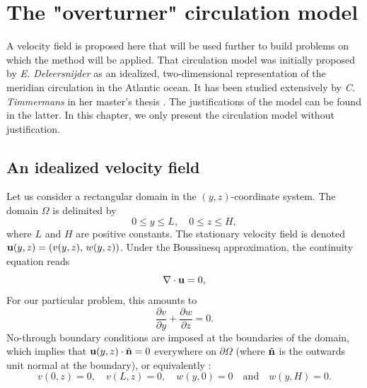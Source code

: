 \chapter{The "overturner" circulation model} \label{chap:overturnercirculation}
A velocity field is proposed here that will be used further to build problems on which the method will be applied. That circulation model was initially proposed by \textit{E. Deleersnijder} \cite{deleersnijder2006overturner} as an idealized, two-dimensional representation of the meridian circulation in the Atlantic ocean. It has been studied extensively by \textit{C. Timmermans} in her master's thesis \cite{timmermans2006masterthesis}. The justifications of the model can be found in the latter. In this chapter, we only present the circulation model without justification. 

\section{An idealized velocity field}
Let us consider a rectangular domain in the $(y,z)$-coordinate system. 
The domain $\Omega$ is delimited by
\begin{equation} 
	0 \le y \le L,\quad 0 \le z \le H,
\end{equation}
where $L$ and $H$ are positive constants. 
The stationary velocity field is denoted $\mathbf u(y,z) = (v(y,z),\, w(y,z))$. Under the Boussinesq approximation, the continuity equation reads
\begin{equation} \label{eq:continuity_boussinesq}
	\nabla \cdot \mathbf u = 0,
\end{equation}
For our particular problem, this amounts to
\begin{equation}
	\frac{\partial v}{\partial y} + \frac{\partial w}{\partial z} = 0.
\end{equation}
No-through boundary conditions are imposed at the boundaries of the domain, which implies that $\mathbf u(y,z) \cdot \hat{\mathbf{n}} = 0$ everywhere on $\partial \Omega$ (where $\hat{\mathbf{n}}$ is the outwards unit normal at the boundary), or equivalently :
\begin{equation} \label{eq:overturnerBC}
	v(0,z) = 0, \quad v(L,z) = 0, \quad w(y,0) = 0 \quad \mbox{and} \quad w(y,H) = 0.
\end{equation}

